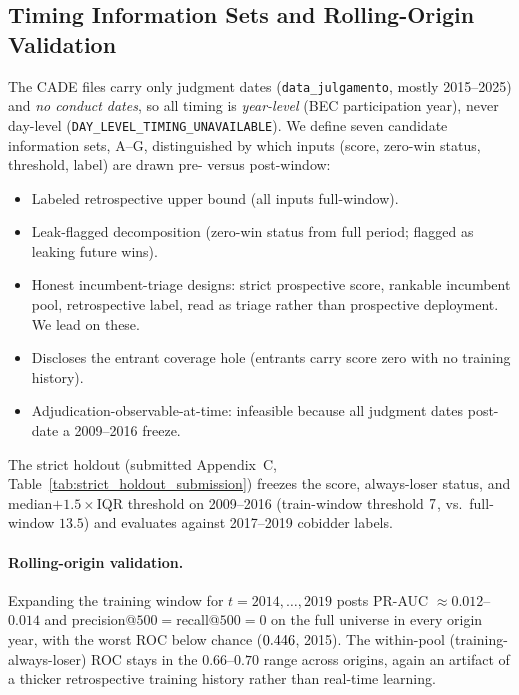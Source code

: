 \subsection{Timing Information Sets and Rolling-Origin Validation}
\label{supp:timing_sets}

The CADE files carry only judgment dates (\texttt{data\_julgamento},
mostly 2015--2025) and \emph{no conduct dates}, so all timing is
\emph{year-level} (BEC participation year), never day-level
(\texttt{DAY\_LEVEL\_TIMING\_UNAVAILABLE}). We define seven candidate
information sets, A--G, distinguished by which inputs (score, zero-win
status, threshold, label) are drawn pre- versus post-window:

\begin{itemize}
\item[\textbf{A}] Labeled retrospective upper bound (all inputs
full-window).
\item[\textbf{B}] Leak-flagged decomposition (zero-win status from full
period; flagged as leaking future wins).
\item[\textbf{C/D/G}] Honest incumbent-triage designs: strict
prospective score, rankable incumbent pool, retrospective label, read as
triage rather than prospective deployment. We lead on these.
\item[\textbf{E}] Discloses the entrant coverage hole (entrants carry
score zero with no training history).
\item[\textbf{F}] Adjudication-observable-at-time: infeasible because all
judgment dates post-date a 2009--2016 freeze.
\end{itemize}

The strict holdout (submitted Appendix~C,
Table~\ref{tab:strict_holdout_submission}) freezes the score,
always-loser status, and median$+1.5\times$IQR threshold on 2009--2016
(train-window threshold $7$, vs.\ full-window
$13.5$) and evaluates against 2017--2019 cobidder labels.

\paragraph{Rolling-origin validation.} Expanding the training window for
$t=2014,\dots,2019$ posts PR-AUC $\approx 0.012$--$0.014$ and
precision@$500=$recall@$500=0$ on the full universe in every origin
year, with the worst ROC below chance ($0.446$, 2015). The
within-pool (training-always-loser) ROC stays in the $0.66$--$0.70$
range across origins, again an artifact of a thicker retrospective
training history rather than real-time learning.

